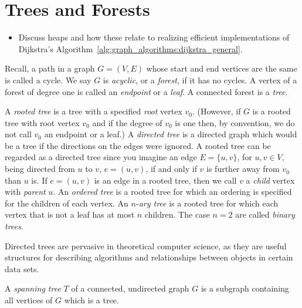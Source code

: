 
\chapter{Trees and Forests}
\label{chap:trees_forests}

\begin{itemize}
\item Discuss heaps and how these relate to realizing efficient
  implementations of Dijkstra's
  Algorithm~\ref{alg:graph_algorithms:dijkstra_general}.
\end{itemize}

Recall, a path in a graph $G = (V, E)$ whose start and end vertices
are the same is called a cycle. We say $G$ is \emph{acyclic}, or a
\emph{forest}, if it has no cycles. A vertex of a forest of degree one
is called an \emph{endpoint} or a \emph{leaf}.
A connected forest is a \emph{tree}.

A \emph{rooted tree} is a tree with a specified \emph{root} vertex
$v_0$. (However, if $G$ is a rooted tree with root vertex $v_0$ and if
the degree of $v_0$ is one then, by convention, we do not call $v_0$
an endpoint or a leaf.)
A \emph{directed tree} is a directed graph which would be a tree if
the directions on the edges were ignored.
A rooted tree can be regarded as a directed tree since you imagine an
edge $E = \{u, v\}$, for $u, v \in V$, being directed from $u$ to $v$,
$e = (u, v)$, if and only if $v$ is further away from $v_0$ than $u$
is. If $e = (u, v)$ is an edge in a rooted tree, then we call $v$ a
\emph{child} vertex with \emph{parent} $u$. An \emph{ordered tree} is
a rooted tree for which an ordering is specified for the children of
each vertex.
An $n$-\emph{ary tree} is a rooted tree for which each vertex that is
not a leaf has at most $n$ children. The case $n = 2$ are called
\emph{binary trees}.

Directed trees are pervasive in theoretical computer science, as they
are useful structures for describing algorithms and relationships
between objects in certain data sets.

A \emph{spanning tree} $T$ of a connected, undirected graph $G$ is a
subgraph containing all vertices of $G$ which is a tree.

